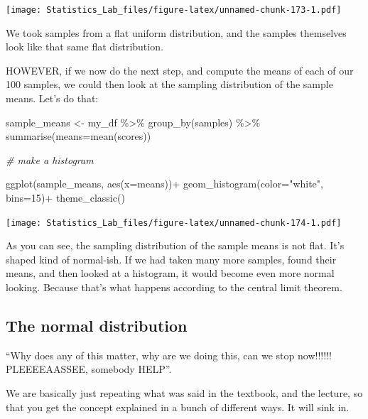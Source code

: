 \documentclass[
]{book}
\newenvironment{Shaded}{\begin{snugshade}}{\end{snugshade}}
\newcommand{\AttributeTok}[1]{\textcolor[rgb]{0.77,0.63,0.00}{#1}}
\newcommand{\CommentTok}[1]{\textcolor[rgb]{0.56,0.35,0.01}{\textit{#1}}}
\newcommand{\DecValTok}[1]{\textcolor[rgb]{0.00,0.00,0.81}{#1}}
\newcommand{\FunctionTok}[1]{\textcolor[rgb]{0.00,0.00,0.00}{#1}}
\newcommand{\NormalTok}[1]{#1}
\newcommand{\OtherTok}[1]{\textcolor[rgb]{0.56,0.35,0.01}{#1}}
\newcommand{\SpecialCharTok}[1]{\textcolor[rgb]{0.00,0.00,0.00}{#1}}
\newcommand{\StringTok}[1]{\textcolor[rgb]{0.31,0.60,0.02}{#1}}
\begin{document}
\texttt{[image: Statistics\_Lab\_files/figure-latex/unnamed-chunk-173-1.pdf]}

We took samples from a flat uniform distribution, and the samples themselves look like that same flat distribution.

HOWEVER, if we now do the next step, and compute the means of each of our 100 samples, we could then look at the sampling distribution of the sample means. Let's do that:

\begin{Shaded}
\begin{Highlighting}[]
\NormalTok{sample\_means }\OtherTok{\textless{}{-}}\NormalTok{ my\_df }\SpecialCharTok{\%\textgreater{}\%}
                \FunctionTok{group\_by}\NormalTok{(samples) }\SpecialCharTok{\%\textgreater{}\%}
                \FunctionTok{summarise}\NormalTok{(}\AttributeTok{means=}\FunctionTok{mean}\NormalTok{(scores))}

\CommentTok{\# make a histogram}

 \FunctionTok{ggplot}\NormalTok{(sample\_means, }\FunctionTok{aes}\NormalTok{(}\AttributeTok{x=}\NormalTok{means))}\SpecialCharTok{+}
  \FunctionTok{geom\_histogram}\NormalTok{(}\AttributeTok{color=}\StringTok{"white"}\NormalTok{, }\AttributeTok{bins=}\DecValTok{15}\NormalTok{)}\SpecialCharTok{+}
  \FunctionTok{theme\_classic}\NormalTok{()}
\end{Highlighting}
\end{Shaded}

\texttt{[image: Statistics\_Lab\_files/figure-latex/unnamed-chunk-174-1.pdf]}

As you can see, the sampling distribution of the sample means is not flat. It's shaped kind of normal-ish. If we had taken many more samples, found their means, and then looked at a histogram, it would become even more normal looking. Because that's what happens according to the central limit theorem.

\hypertarget{the-normal-distribution}{%
\subsection{The normal distribution}\label{the-normal-distribution}}

``Why does any of this matter, why are we doing this, can we stop now!!!!!! PLEEEEAASSEE, somebody HELP''.

We are basically just repeating what was said in the textbook, and the lecture, so that you get the concept explained in a bunch of different ways. It will sink in.
\end{document}
